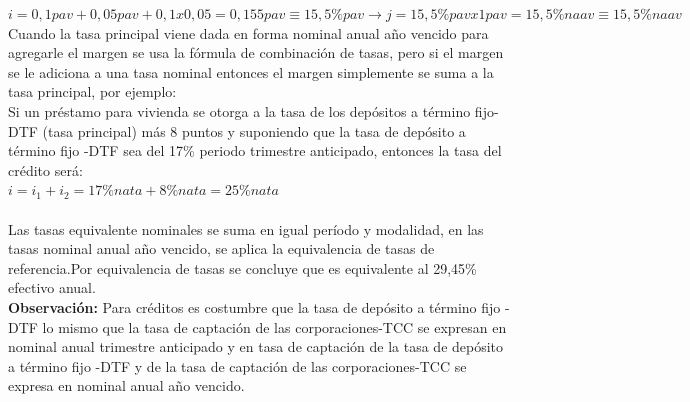 $i= 0,1 pav + 0,05 pav + 0,1 x 0,05 = 0,155 pav \equiv 15,5\% pav  \rightarrow  j = 15,5\% pav x1 pav = 15,5\%naav \equiv 15,5 \%naav$ \\

Cuando la tasa principal viene dada en forma nominal anual año vencido para agregarle el margen se usa la fórmula de combinación de tasas, pero si el margen se le adiciona a una tasa nominal entonces el margen simplemente se suma a la tasa principal, por ejemplo: \\

Si un préstamo para vivienda se otorga a la tasa de los depósitos a término fijo-DTF (tasa principal) más 8 puntos y suponiendo que la tasa de depósito a término fijo -DTF sea del 17\% periodo trimestre anticipado, entonces la tasa del crédito será: \\

 $i = i_{1} + i_{2}
  = 17\%nata + 8\%nata = 25\% nata$\\\\ Las tasas equivalente nominales se suma en igual período y modalidad, en las tasas nominal anual año vencido, se aplica la equivalencia de tasas de referencia.Por equivalencia de tasas se concluye que es equivalente al 29,45\% efectivo anual.\\

\textbf{Observación:} Para créditos es costumbre que la tasa de depósito a término fijo -DTF lo mismo que la tasa de captación de las corporaciones-TCC se expresan en nominal anual trimestre anticipado y en tasa de captación de la tasa de depósito a término fijo -DTF y de la tasa de captación de las corporaciones-TCC se expresa en nominal anual año vencido.





%

